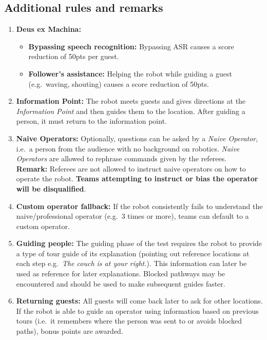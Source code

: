 \subsection*{Additional rules and remarks}
\begin{enumerate}[nosep]
	\item \textbf{Deus ex Machina:}
	\begin{itemize}[nosep]
		\item \textbf{Bypassing speech recognition:} Bypassing ASR causes a score reduction of 50pts per guest.

		\item \textbf{Follower's assistance:} Helping the robot while guiding a guest (e.g.~waving, shouting) causes a score reduction of 50pts.
	\end{itemize}

	\item \textbf{Information Point:} The robot meets guests and gives directions at the \emph{Information Point} and then guides them to the location.
	After guiding a person, it must return to the information point.

	\item \textbf{Naive Operators:} Optionally, questions can be asked by a \emph{Naive Operator}, i.e.~a person from the audience with no background on robotics. \emph{Naive Operators} are allowed to rephrase commands given by the referees.
	\\\textbf{Remark:} Referees are not allowed to instruct naive operators on how to operate the robot. \textbf{Teams attempting to instruct or bias the operator will be disqualified}.

	\item \textbf{Custom operator fallback:} If the robot consistently fails to understand the naive/professional operator (e.g.~3 times or more), teams can default to a custom operator.

	\item \textbf{Guiding people:} The guiding phase of the test requires the robot to provide a type of tour guide of its explanation (pointing out reference locations at each step e.g.~\emph{The couch is at your right.}). This information can later be used as reference for later explanations. Blocked pathways may be encountered and should be used to make subsequent guides faster.

	\item \textbf{Returning guests:} All guests will come back later to ask for other locations.
	If the robot is able to guide an operator using information based on previous tours (i.e.~it remembers where the person was sent to or avoids blocked paths), bonus points are awarded.
\end{enumerate}


